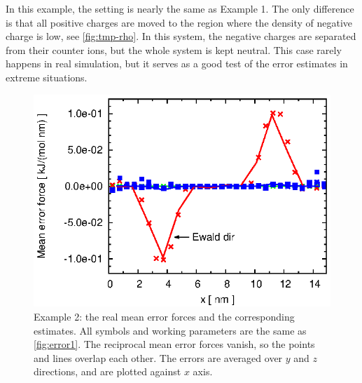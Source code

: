 \documentclass[journal=jacsat,manuscript=article]{achemso}
\begin{document}
In this example, the setting is nearly the same as
Example 1. The only difference is that all positive charges
are moved to the region where the density of negative charge is low,
see \ref{fig:tmp-rho}.
In this system, the negative charges are separated from their
counter ions, but the whole system is kept neutral. This case rarely
happens in real simulation, but it serves as a good test of the error
estimates in extreme situations.

\begin{figure}
  \centering
  \includegraphics[]{fig.rand2.meanf.eps}
  \caption{
    Example 2: the real mean error forces and the corresponding
    estimates. All symbols and working parameters are the same
    as     \ref{fig:error1}.
    The reciprocal mean error forces vanish, so the points and lines
    overlap each other. 
    The errors are averaged over $y$ and $z$ directions, and are
    plotted against $x$ axis.
    }
  \label{fig:meanf2}
\end{figure}
\end{document}
